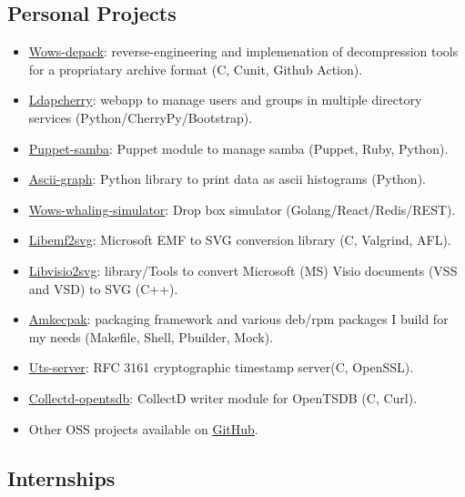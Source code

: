 \documentclass[10pt,a4paper,sans]{moderncv}        %
\begin{document}
\subsection{Personal Projects}
        {}
        {}
        {}
        {
        \begin{itemize}
        \item \href{https://github.com/wows-tools/wows-depack}{Wows-depack}: reverse-engineering and implemenation of decompression tools for a propriatary archive format (C, Cunit, Github Action).
        \item \href{https://github.com/kakwa/ldapcherry}{Ldapcherry}: webapp to manage users and groups in multiple directory services (Python/CherryPy/Bootstrap).
        \item \href{https://github.com/kakwa/puppet-samba}{Puppet-samba}: Puppet module to manage samba (Puppet, Ruby, Python).
        \item \href{https://github.com/kakwa/py-ascii-graph}{Ascii-graph}: Python library to print data as ascii histograms (Python).
        \item \href{https://github.com/wows-tools/wows-whaling-simulator}{Wows-whaling-simulator}: Drop box simulator (Golang/React/Redis/REST).
        \item \href{https://github.com/kakwa/libemf2svg}{Libemf2svg}: Microsoft EMF to SVG conversion library (C, Valgrind, AFL).
        \item \href{https://github.com/kakwa/libvisio2svg}{Libvisio2svg}: library/Tools to convert Microsoft (MS) Visio documents (VSS and VSD) to SVG (C++).
        \item \href{https://github.com/kakwa/amkecpak}{Amkecpak}: packaging framework and various deb/rpm packages I build for my needs (Makefile, Shell, Pbuilder, Mock).
        \item \href{https://github.com/kakwa/uts-server}{Uts-server}: RFC 3161 cryptographic timestamp server(C, OpenSSL).
        \item \href{https://github.com/kakwa/collectd-opentsdb}{Collectd-opentsdb}: CollectD writer module for OpenTSDB (C, Curl).
        \item Other OSS projects available on \href{https://github.com/kakwa?tab=repositories&q=&type=&language=&sort=stargazers}{GitHub}.
        \end{itemize}
        }

\subsection{Internships}
\end{document}
